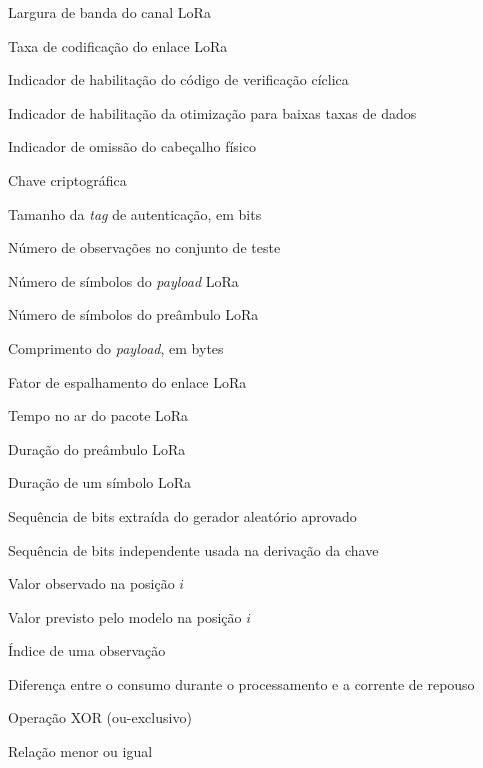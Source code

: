 \documentclass[
	12pt,				%
	openright,			%
	twoside,			%
	a4paper,			%
	english,			%
	brazilian				%
	]{abntex2}
\begin{document}
\begin{simbolos}
  \item[$\mathrm{BW}$] Largura de banda do canal LoRa
  \item[$\mathrm{CR}$] Taxa de codificação do enlace LoRa
  \item[$\mathrm{CRC}$] Indicador de habilitação do código de verificação cíclica
  \item[$\mathrm{DE}$] Indicador de habilitação da otimização para baixas taxas de dados
  \item[$\mathrm{IH}$] Indicador de omissão do cabeçalho físico
  \item[$K$] Chave criptográfica
  \item[$\lambda$] Tamanho da \textit{tag} de autenticação, em bits
  \item[$n$] Número de observações no conjunto de teste
  \item[$n_{\mathrm{payload}}$] Número de símbolos do \textit{payload} LoRa
  \item[$n_{\mathrm{pre}}$] Número de símbolos do preâmbulo LoRa
  \item[$\mathrm{PL}$] Comprimento do \textit{payload}, em bytes
  \item[$\mathrm{SF}$] Fator de espalhamento do enlace LoRa
  \item[$T_{\mathrm{pacote}}$] Tempo no ar do pacote LoRa
  \item[$T_{\mathrm{pre}}$] Duração do preâmbulo LoRa
  \item[$T_s$] Duração de um símbolo LoRa
  \item[$U$] Sequência de bits extraída do gerador aleatório aprovado
  \item[$V$] Sequência de bits independente usada na derivação da chave
  \item[$y_i$] Valor observado na posição $i$
  \item[$\hat{y}_i$] Valor previsto pelo modelo na posição $i$
  \item[$i$] Índice de uma observação
  \item[$\Delta$] Diferença entre o consumo durante o processamento e a corrente de repouso
  \item[$\oplus$] Operação XOR (ou-exclusivo)
  \item[$\leq$] Relação menor ou igual
\end{simbolos}

\tableofcontents*
\cleardoublepage
\end{document}
